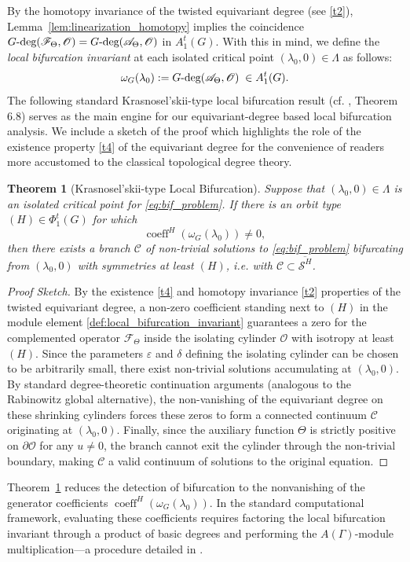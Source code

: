 \documentclass[twoside,11pt]{article}
\def\gdeg{G\text{\rm -deg}}
\newtheorem{theorem}{Theorem}[section]
\begin{document}
By the homotopy invariance of the twisted equivariant degree (see \ref{t2}), Lemma~\ref{lem:linearization_homotopy} implies the coincidence $\gdeg(\mathscr{F}_\Theta, \mathscr{O}) = \gdeg(\mathscr{A}_\Theta, \mathscr{O})$ in $A_1^t(G)$. With this in mind, we define the \emph{local bifurcation invariant} at each isolated critical point $(\lambda_0,0) \in \Lambda$ as follows:
\begin{equation}\label{def:local_bifurcation_invariant}
    \omega_G(\lambda_0) := \gdeg(\mathscr{A}_\Theta, \mathscr{O}) \;\in A_1^t(G).
\end{equation}
The following standard Krasnosel'skii-type local bifurcation result (cf. \cite{book-new}, Theorem 6.8) serves as the main engine for our equivariant-degree based local bifurcation analysis. We include a sketch of the proof which highlights the role of the existence property \ref{t4} of the equivariant degree  for the convenience of readers more accustomed to the classical topological degree theory.
\begin{theorem}[Krasnosel'skii-type Local Bifurcation] \rm \label{thm:app_abstract_local_bif}
Suppose that $(\lambda_0,0) \in \Lambda$ is an isolated critical point for \eqref{eq:bif_problem}. If there is an orbit type $(H) \in \Phi_1^t(G)$ for which 
\[
\operatorname{coeff}^H(\omega_{G}(\lambda_0)) \neq 0,
\]
then there exists a branch $\mathscr C$ of non-trivial solutions to \eqref{eq:bif_problem} bifurcating from $(\lambda_0,0)$ with symmetries at least $(H)$, i.e. with $\mathscr C \subset \overline{\mathscr S^H}$.
\end{theorem}
\begin{proof}[Proof Sketch]
By the existence \ref{t4} and homotopy invariance \ref{t2} properties of the twisted equivariant degree, a non-zero coefficient standing next to $(H)$ in the module element \eqref{def:local_bifurcation_invariant} guarantees a zero for the complemented operator $\mathscr{F}_\Theta$ inside the isolating cylinder $\mathscr{O}$ with isotropy at least $(H)$. Since the parameters $\varepsilon$ and $\delta$ defining the isolating cylinder can be chosen to be arbitrarily small, there exist non-trivial solutions accumulating at $(\lambda_0, 0)$. By standard degree-theoretic continuation arguments (analogous to the Rabinowitz global alternative), the non-vanishing of the equivariant degree on these shrinking cylinders forces these zeros to form a connected continuum $\mathscr C$ originating at $(\lambda_0, 0)$. Finally, since the auxiliary function $\Theta$ is strictly positive on $\partial \mathscr{O}$ for any $u \neq 0$, the branch cannot exit the cylinder through the non-trivial boundary, making $\mathscr{C}$ a valid continuum of solutions to the original equation.
\end{proof}
Theorem~\ref{thm:app_abstract_local_bif} reduces the detection of bifurcation to the nonvanishing of the generator coefficients $\operatorname{coeff}^H(\omega_G(\lambda_0))$. In the standard computational framework, evaluating these coefficients requires factoring the local bifurcation invariant through a product of basic degrees and performing the $A(\Gamma)$-module multiplication---a procedure detailed in \cite{AED, book-new, survey}. 
\end{document}
